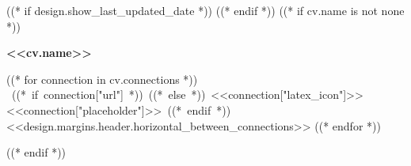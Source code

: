 ((* if design.show_last_updated_date *))
\placelastupdatedtext
((* endif *))
((* if cv.name is not none *))
\begin{header}
    \fontsize{<<design.header_font_size>>}{<<design.header_font_size>>}
    \textbf{<<cv.name>>}

    \vspace{<<design.margins.header.vertical_between_name_and_connections>>}

    \normalsize
    ((* for connection in cv.connections *))
    \mbox{
        ((* if connection["url"] *))
        ((* else *))
        {\footnotesize<<connection["latex_icon"]>>}\hspace*{0.13cm}<<connection["placeholder"]>>
        ((* endif *))
    }
    \kern <<design.margins.header.horizontal_between_connections>>
    ((* endfor *))
\end{header}

\vspace{<<design.margins.header.bottom>> - <<design.margins.section_title.top>>}
((* endif *))